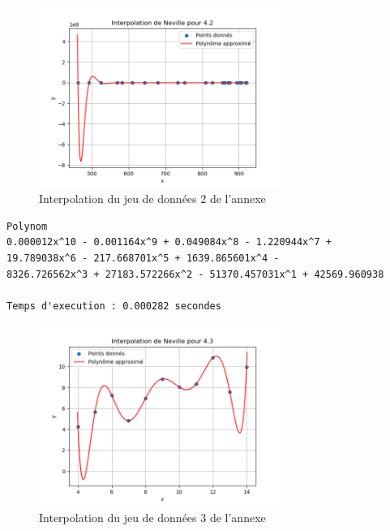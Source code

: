 \begin{figure}[h]
    \centering
    \includegraphics[width=0.7\textwidth]{sources/Corentin/polynomApproch/results/graphs/42.png}
    \caption{Interpolation du jeu de données 2 de l'annexe}
\end{figure}
\newpage
\begin{lstlisting}[caption={Annexe 3 data} results, basicstyle=\fontsize{8}{10}\selectfont]
    Polynom
0.000012x^10 - 0.001164x^9 + 0.049084x^8 - 1.220944x^7 + 
19.789038x^6 - 217.668701x^5 + 1639.865601x^4 - 
8326.726562x^3 + 27183.572266x^2 - 51370.457031x^1 + 42569.960938

Temps d'execution : 0.000282 secondes
\end{lstlisting}
\begin{figure}[h]
    \centering
    \includegraphics[width=0.7\textwidth]{sources/Corentin/polynomApproch/results/graphs/43.png}
    \caption{Interpolation du jeu de données 3 de l'annexe}
\end{figure}
\newpage
